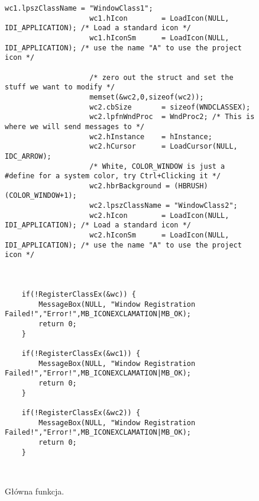 \documentclass[a4paper,twoside,12pt]{mgr}
\begin{document}
\begin{figure}[H]
\centering
\begin{lstlisting}[frame=single]	
					wc1.lpszClassName = "WindowClass1";
					wc1.hIcon		 = LoadIcon(NULL, IDI_APPLICATION); /* Load a standard icon */
					wc1.hIconSm		 = LoadIcon(NULL, IDI_APPLICATION); /* use the name "A" to use the project icon */
					
					/* zero out the struct and set the stuff we want to modify */
					memset(&wc2,0,sizeof(wc2));
					wc2.cbSize		 = sizeof(WNDCLASSEX);
					wc2.lpfnWndProc	 = WndProc2; /* This is where we will send messages to */
					wc2.hInstance	 = hInstance;
					wc2.hCursor		 = LoadCursor(NULL, IDC_ARROW);
					/* White, COLOR_WINDOW is just a #define for a system color, try Ctrl+Clicking it */
					wc2.hbrBackground = (HBRUSH)(COLOR_WINDOW+1);
					wc2.lpszClassName = "WindowClass2";
					wc2.hIcon		 = LoadIcon(NULL, IDI_APPLICATION); /* Load a standard icon */
					wc2.hIconSm		 = LoadIcon(NULL, IDI_APPLICATION); /* use the name "A" to use the project icon */


	
	if(!RegisterClassEx(&wc)) {
		MessageBox(NULL, "Window Registration Failed!","Error!",MB_ICONEXCLAMATION|MB_OK);
		return 0;
	}
	
	if(!RegisterClassEx(&wc1)) {
		MessageBox(NULL, "Window Registration Failed!","Error!",MB_ICONEXCLAMATION|MB_OK);
		return 0;
	}
	
	if(!RegisterClassEx(&wc2)) {
		MessageBox(NULL, "Window Registration Failed!","Error!",MB_ICONEXCLAMATION|MB_OK);
		return 0;
	}
	
	
	\end{lstlisting}
\caption{Główna funkcja.}%
\label{rys:etykieta}
\end{figure}	
\end{document}
